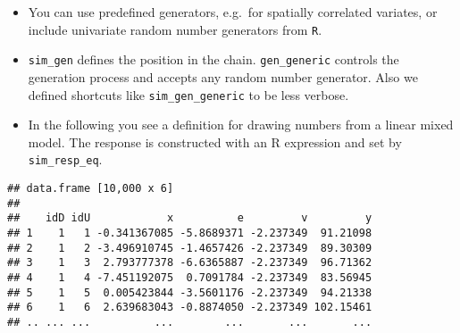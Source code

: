 \begin{itemize}
\itemsep1pt\parskip0pt
\item
  You can use predefined generators, e.g.~for spatially correlated
  variates, or include univariate random number generators from
  \texttt{R}.
\item
  \texttt{sim\_gen} defines the position in the chain.
  \texttt{gen\_generic} controls the generation process and accepts any
  random number generator. Also we defined shortcuts like
  \texttt{sim\_gen\_generic} to be less verbose.
\item
  In the following you see a definition for drawing numbers from a
  linear mixed model. The response is constructed with an R expression
  and set by \texttt{sim\_resp\_eq}.
\end{itemize}

\begin{Shaded}
\end{Shaded}

\begin{verbatim}
## data.frame [10,000 x 6]
## 
##    idD idU            x          e         v         y
## 1    1   1 -0.341367085 -5.8689371 -2.237349  91.21098
## 2    1   2 -3.496910745 -1.4657426 -2.237349  89.30309
## 3    1   3  2.793777378 -6.6365887 -2.237349  96.71362
## 4    1   4 -7.451192075  0.7091784 -2.237349  83.56945
## 5    1   5  0.005423844 -3.5601176 -2.237349  94.21338
## 6    1   6  2.639683043 -0.8874050 -2.237349 102.15461
## .. ... ...          ...        ...       ...       ...
\end{verbatim}

